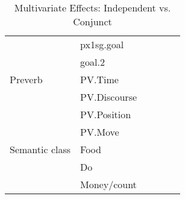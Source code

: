 \begin{table}[]
\begin{tabular}{@{}llllll@{}}
               & px1sg.goal       &                      &                                            & \cellcolor[HTML]{B6D7A8}{ IND}       &                      \\
               & goal.2           &                      &                                            &                      & \cellcolor[HTML]{EA9999}{ CNJ}       \\
\midrule
Preverb        & PV.Time          & \cellcolor[HTML]{EA9999}{ CNJ}       & \cellcolor[HTML]{B6D7A8}{ IND}       &                      & \cellcolor[HTML]{EA9999}{ CNJ}       \\
               & PV.Discourse     &                      & \cellcolor[HTML]{EA9999}{ CNJ}       & \cellcolor[HTML]{EA9999}{ CNJ}       &                      \\
               & PV.Position      &                      &                      &                      & \cellcolor[HTML]{EA9999}{ CNJ}       \\
               & PV.Move          &                      &                      &                      & \cellcolor[HTML]{EA9999}{ CNJ}       \\
\midrule
Semantic class & Food             &                      &                      &                      & \cellcolor[HTML]{EA9999}{ CNJ}       \\
               & Do               &                      &                      & \cellcolor[HTML]{EA9999}{ CNJ}       &                      \\
               & Money/count      &                      &                      & \cellcolor[HTML]{EA9999}{ CNJ}       &                      \\ \bottomrule
\end{tabular}
            \caption{
               Multivariate Effects: Independent vs. Conjunct \\ \label{tab:disscivc}
              }
\end{table}


